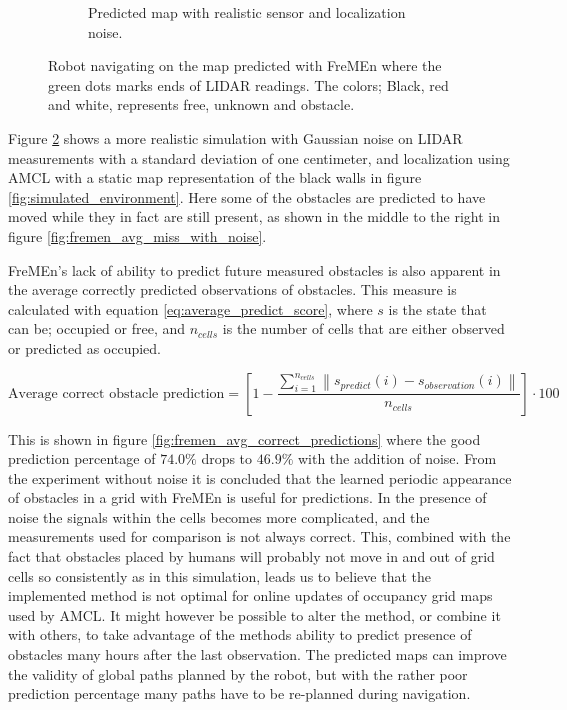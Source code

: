 \begin{figure}[htbp]
\begin{subfigure}[t]{0.49\textwidth}
        \caption{Predicted map with realistic sensor and localization noise.}
        \label{fig:fremen_sim_with_noise}
    \end{subfigure}
    \caption{Robot navigating on the map predicted with FreMEn where the green dots marks ends of LIDAR readings. The colors; Black, red and white, represents free, unknown and obstacle.}
\end{figure}

Figure \ref{fig:fremen_sim_with_noise} shows a more realistic simulation with Gaussian noise on LIDAR measurements with a standard deviation of one centimeter, and localization using AMCL with a static map representation of the black walls in figure \ref{fig:simulated_environment}.
Here some of the obstacles are predicted to have moved while they in fact are still present, as shown in the middle to the right in figure \ref{fig:fremen_avg_miss_with_noise}.

FreMEn's lack of ability to predict future measured obstacles is also apparent in the average correctly predicted observations of obstacles. This measure is calculated with equation \ref{eq:average_predict_score}, where $s$ is the state that can be; occupied or free, and $n_{cells}$ is the number of cells that are either observed or predicted as occupied.

\begin{equation}
\text{Average correct obstacle prediction} = \left[1- \frac{\sum\limits_{i=1}^{n_{cells}} \left\|s_{predict}(i)-s_{observation}(i)\right\|}{n_{cells}}
\right]\cdot 100
\label{eq:average_predict_score}
\end{equation} 

This is shown in figure \ref{fig:fremen_avg_correct_predictions} where the good prediction percentage of $74.0\%$ drops to $46.9\%$ with the addition of noise.
From the experiment without noise it is concluded that the learned periodic appearance of obstacles in a grid with FreMEn is useful for predictions.
In the presence of noise the signals within the cells becomes more complicated, and the measurements used for comparison is not always correct.
This, combined with the fact that obstacles placed by humans will probably not move in and out of grid cells so consistently as in this simulation, leads us to believe that the implemented method is not optimal for online updates of occupancy grid maps used by AMCL.
It might however be possible to alter the method, or combine it with others, to take advantage of the methods ability to predict presence of obstacles many hours after the last observation.
The predicted maps can improve the validity of global paths planned by the robot, but with the rather poor prediction percentage many paths have to be re-planned during navigation.

